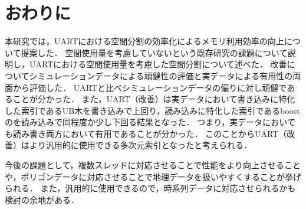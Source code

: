 \chapter{おわりに}

本研究では，UARTにおける空間分割の効率化によるメモリ利用効率の向上について提案した．
空間使用量を考慮していないという既存研究の課題について説明し，UARTにおける空間使用量を考慮した空間分割について述べた．
改善についてシミュレーションデータによる頑健性の評価と実データによる有用性の両面から評価した．
UARTと比べシミュレーションデータの偏りに対し頑健であることが分かった．
また，UART（改善）は実データにおいて書き込みに特化した索引であるUB木を書き込みで上回り，読み込みに特化した索引であるboostの\RTree を読み込みで同程度か少し下回る結果となった．
つまり，実データにおいても読み書き両方において有用であることが分かった．
このことからUART（改善）はより汎用的に使用できる多次元索引となったと考えられる．

今後の課題として，複数スレッドに対応させることで性能をより向上させることや，ポリゴンデータに対応させることで地理データを扱いやすくすることが挙げられる．
また，汎用的に使用できるので，時系列データに対応させられるかも検討の余地がある．
